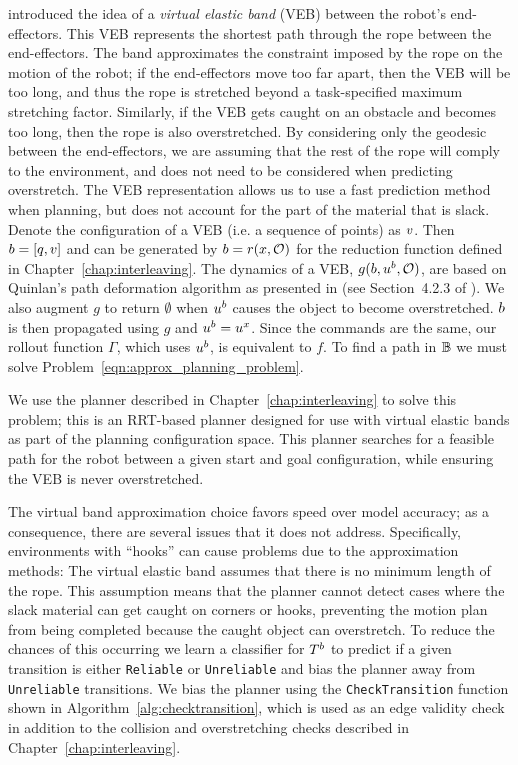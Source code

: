 \label{sec:isrr_model_approx}

\citet{McConachie2017} introduced the idea of a \textit{virtual elastic band} (VEB) between the robot's end-effectors. This VEB represents the shortest path through the rope between the end-effectors. The band approximates the constraint imposed by the rope on the motion of the robot; if the end-effectors move too far apart, then the VEB will be too long, and thus the rope is stretched beyond a task-specified maximum stretching factor. Similarly, if the VEB gets caught on an obstacle and becomes too long, then the rope is also overstretched. By considering only the geodesic between the end-effectors, we are assuming that the rest of the rope will comply to the environment, and does not need to be considered when predicting overstretch. The VEB representation allows us to use a fast prediction method when planning, but does not account for the part of the material that is slack. Denote the configuration of a VEB (i.e. a sequence of points) as $v$. Then $b = [q,v]$ and can be generated by $b = r(x,\mathcal{O})$ for the reduction function defined in Chapter~\ref{chap:interleaving}. The dynamics of a VEB, $g(b,u^b,\mathcal{O})$, are based on Quinlan's path deformation algorithm as presented in \cite{Quinlan1994} (see Section~4.2.3 of \cite{McConachie2017}). We also augment $g$ to return $\emptyset$ when $u^b$ causes the object to become overstretched. $b$ is then propagated using $g$ and $u^b = u^x$. Since the commands are the same, our rollout function $\Gamma$, which uses $u^b$, is equivalent to $f$. To find a path in $\mathbb{B}$ we must solve Problem~\eqref{eqn:approx_planning_problem}.

We use the planner described in Chapter~\ref{chap:interleaving} to solve this problem; this is an RRT-based planner designed for use with virtual elastic bands as part of the planning configuration space. This planner searches for a feasible path for the robot between a given start and goal configuration, while ensuring the VEB is never overstretched.

The virtual band approximation choice favors speed over model accuracy; as a consequence, there are several issues that it does not address. Specifically, environments with ``hooks'' can cause problems due to the approximation methods: The virtual elastic band assumes that there is no minimum length of the rope. This assumption means that the planner cannot detect cases where the slack material can get caught on corners or hooks, preventing the motion plan from being completed because the caught object can overstretch. To reduce the chances of this occurring we learn a classifier for $T^b$ to predict if a given transition is either \texttt{Reliable} or \texttt{Unreliable} and bias the planner away from \texttt{Unreliable} transitions. We bias the planner using the \texttt{CheckTransition} function shown in Algorithm~\ref{alg:checktransition}, which is used as an edge validity check in addition to the collision and overstretching checks described in Chapter~\ref{chap:interleaving}.

